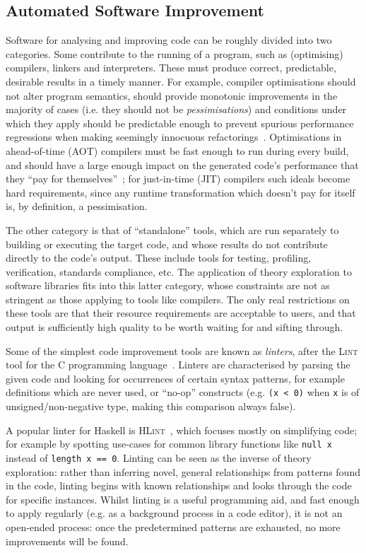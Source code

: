 \subsection{Automated Software Improvement}

Software for analysing and improving code can be roughly divided into two
categories. Some contribute to the running of a program, such as (optimising)
compilers, linkers and interpreters. These must produce correct, predictable,
desirable results in a timely manner. For example, compiler optimisations should
not alter program semantics, should provide monotonic improvements in the
majority of cases (i.e. they should not be \emph{pessimisations}) and conditions
under which they apply should be predictable enough to prevent spurious
performance regressions when making seemingly innocuous
refactorings~\cite{robison2001impact}. Optimisations in ahead-of-time (AOT)
compilers must be fast enough to run during every build, and should have a large
enough impact on the generated code's performance that they
``pay for themselves''~\cite{Franz1994}; for just-in-time (JIT) compilers such
ideals become hard requirements, since any runtime transformation which doesn't
pay for itself is, by definition, a pessimisation.

The other category is that of ``standalone'' tools, which are run separately to
building or executing the target code, and whose results do not contribute
directly to the code's output. These include tools for testing, profiling,
verification, standards compliance, etc. The application of theory exploration
to software libraries fits into this latter category, whose constraints are not
as stringent as those applying to tools like compilers. The only real
restrictions on these tools are that their resource requirements are acceptable
to users, and that output is sufficiently high quality to be worth waiting for
and sifting through.

Some of the simplest code improvement tools are known as \emph{linters}, after
the \textsc{Lint} tool for the C programming language~\cite{Johnson78lint}.
Linters are characterised by parsing the given code and looking for occurrences
of certain syntax patterns, for example definitions which are never used, or
``no-op'' constructs (e.g. \texttt{(x~<~0)} when \texttt{x} is of
unsigned/non-negative type, making this comparison always false).

A popular linter for Haskell is \textsc{HLint}~\cite{mitchell2014hlint}, which
focuses mostly on simplifying code; for example by spotting use-cases for common
library functions like \texttt{null x} instead of \texttt{length x == 0}.
Linting can be seen as the inverse of theory exploration: rather than inferring
novel, general relationships from patterns found in the code, linting begins
with known relationships and looks through the code for specific instances.
Whilst linting is a useful programming aid, and fast enough to apply regularly
(e.g. as a background process in a code editor), it is not an open-ended
process: once the predetermined patterns are exhausted, no more improvements
will be found.

